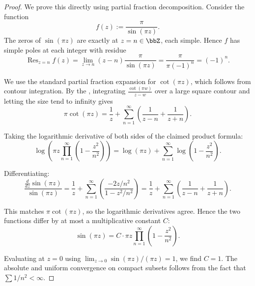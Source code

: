 \begin{proof}
    We prove this directly using partial fraction decomposition. Consider the function
    $$f(z) := \frac{\pi}{\sin(\pi z)}.$$
    The zeros of $\sin(\pi z)$ are exactly at $z = n \in \bbZ$, each simple. Hence $f$ has simple poles at each integer with residue
    $$\operatorname{Res}_{z=n} f(z) = \lim_{z \to n} (z-n)\frac{\pi}{\sin(\pi z)} = \frac{\pi}{\pi(-1)^n} = (-1)^n.$$

    We use the standard partial fraction expansion for $\cot(\pi z)$, which follows from contour integration. By the , integrating $\frac{\cot(\pi w)}{z-w}$ over a large square contour and letting the size tend to infinity gives
    $$\pi \cot(\pi z) = \frac{1}{z} + \sum_{n=1}^\infty \left(\frac{1}{z-n} + \frac{1}{z+n}\right).$$

    Taking the logarithmic derivative of both sides of the claimed product formula:
    $$\log\left(\pi z \prod_{n=1}^\infty \left(1 - \frac{z^2}{n^2}\right)\right) = \log(\pi z) + \sum_{n=1}^\infty \log\left(1 - \frac{z^2}{n^2}\right).$$

    Differentiating:
    $$\frac{\frac{d}{dz}\sin(\pi z)}{\sin(\pi z)} = \frac{1}{z} + \sum_{n=1}^\infty \left(\frac{-2z/n^2}{1-z^2/n^2}\right) = \frac{1}{z} + \sum_{n=1}^\infty \left(\frac{1}{z-n} + \frac{1}{z+n}\right).$$

    This matches $\pi \cot(\pi z)$, so the logarithmic derivatives agree. Hence the two functions differ by at most a multiplicative constant $C$:
    $$\sin(\pi z) = C \cdot \pi z \prod_{n=1}^\infty \left(1 - \frac{z^2}{n^2}\right).$$

    Evaluating at $z = 0$ using $\lim_{z \to 0} \sin(\pi z)/(\pi z) = 1$, we find $C = 1$. The absolute and uniform convergence on compact subsets follows from the fact that $\sum 1/n^2 < \infty$.
\end{proof}